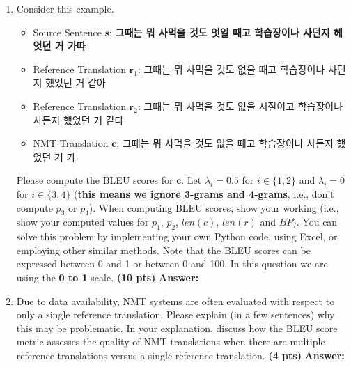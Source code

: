 \documentclass{assignment format}
\newenvironment{answer}{
    {\bf Answer:} \begingroup\color{red}
}{\endgroup}%
\begin{document}
\begin{enumerate}[label=(\alph*)]
    \item Consider this example.
    \begin{itemize}
        \item  Source Sentence $\mathbf{s}$: \textbf{그때는 뭐 사먹을 것도 엇일 때고 학습장이나 사던지 헤엇던 거 가따} 
        \item  Reference Translation $\mathbf{r}_1$: 그때는 뭐 사먹을 것도 없을 때고 학습장이나 사던지 했었던 거 같아 
        \item Reference Translation $\mathbf{r}_2$: 그때는 뭐 사먹을 것도 없을 시절이고 학습장이나 사든지 했었던 거 같다 
        \item NMT Translation $\mathbf{c}$: 그때는 뭐 사먹을 것도 없을 때고 학습장이나 사든지 했었던 거 가
    \end{itemize}
    
    Please compute the BLEU scores for $\mathbf{c}$. Let $\lambda_i=0.5$ for $i\in\{1,2\}$ and $\lambda_i=0$ for $i\in\{3,4\}$ (\textbf{this means we ignore 3-grams and 4-grams}, i.e., don't compute $p_3$ or $p_4$). When computing BLEU scores, show your working (i.e., show your computed values for $p_1$, $p_2$, $len(c)$, $len(r)$ and $BP$). You can solve this problem by implementing your own Python code, using Excel, or employing other similar methods. Note that the BLEU scores can be expressed between 0 and 1 or between 0 and 100. In this question we are using the \textbf{0 to 1} scale. \textbf{(10 pts)}
    \begin{answer}
    \end{answer}
    
\item Due to data availability, NMT systems are often evaluated with respect to only a single reference translation. Please explain (in a few sentences) why this may be problematic. In your explanation, discuss how the BLEU score metric assesses the quality of NMT translations when there are multiple reference translations versus a single reference translation. \textbf{(4 pts)}
    \begin{answer}
    \end{answer}
\end{enumerate}
\end{document}
